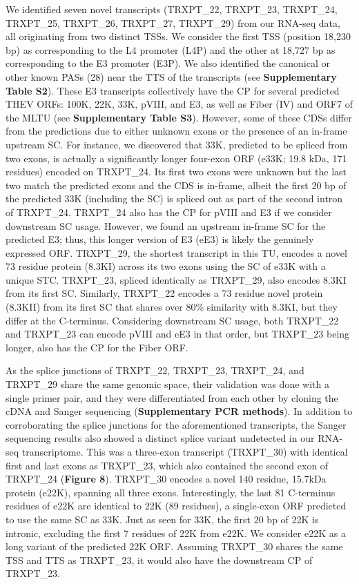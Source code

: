 \documentclass[
]{article}
\begin{document}
We identified seven novel transcripts (TRXPT\_22, TRXPT\_23, TRXPT\_24,
TRXPT\_25, TRXPT\_26, TRXPT\_27, TRXPT\_29) from our RNA-seq data, all
originating from two distinct TSSs. We consider the first TSS (position
18,230 bp) as corresponding to the L4 promoter (L4P) and the other at
18,727 bp as corresponding to the E3 promoter (E3P). We also identified
the canonical or other known PASs (28) near the TTS of the transcripts
(see \textbf{Supplementary Table S2}). These E3 transcripts collectively
have the CP for several predicted THEV ORFs: 100K, 22K, 33K, pVIII, and
E3, as well as Fiber (IV) and ORF7 of the MLTU (see
\textbf{Supplementary Table S3}). However, some of these CDSs differ
from the predictions due to either unknown exons or the presence of an
in-frame upstream SC. For instance, we discovered that 33K, predicted to
be spliced from two exons, is actually a significantly longer four-exon
ORF (e33K; 19.8 kDa, 171 residues) encoded on TRXPT\_24. Its first two
exons were unknown but the last two match the predicted exons and the
CDS is in-frame, albeit the first 20 bp of the predicted 33K (including
the SC) is spliced out as part of the second intron of TRXPT\_24.
TRXPT\_24 also has the CP for pVIII and E3 if we consider downstream SC
usage. However, we found an upstream in-frame SC for the predicted E3;
thus, this longer version of E3 (eE3) is likely the genuinely expressed
ORF. TRXPT\_29, the shortest transcript in this TU, encodes a novel 73
residue protein (8.3KI) across its two exons using the SC of e33K with a
unique STC. TRXPT\_23, spliced identically as TRXPT\_29, also encodes
8.3KI from its first SC. Similarly, TRXPT\_22 encodes a 73 residue novel
protein (8.3KII) from its first SC that shares over 80\% similarity with
8.3KI, but they differ at the C-terminus. Considering downstream SC
usage, both TRXPT\_22 and TRXPT\_23 can encode pVIII and eE3 in that
order, but TRXPT\_23 being longer, also has the CP for the Fiber ORF.

As the splice junctions of TRXPT\_22, TRXPT\_23, TRXPT\_24, and
TRXPT\_29 share the same genomic space, their validation was done with a
single primer pair, and they were differentiated from each other by
cloning the cDNA and Sanger sequencing (\textbf{Supplementary PCR
methods}). In addition to corroborating the splice junctions for the
aforementioned transcripts, the Sanger sequencing results also showed a
distinct splice variant undetected in our RNA-seq transcriptome. This
was a three-exon transcript (TRXPT\_30) with identical first and last
exons as TRXPT\_23, which also contained the second exon of TRXPT\_24
(\textbf{Figure 8}). TRXPT\_30 encodes a novel 140 residue, 15.7kDa
protein (e22K), spanning all three exons. Interestingly, the last 81
C-terminus residues of e22K are identical to 22K (89 residues), a
single-exon ORF predicted to use the same SC as 33K. Just as seen for
33K, the first 20 bp of 22K is intronic, excluding the first 7 residues
of 22K from e22K. We consider e22K as a long variant of the predicted
22K ORF. Assuming TRXPT\_30 shares the same TSS and TTS as TRXPT\_23, it
would also have the downstream CP of TRXPT\_23.
\end{document}
